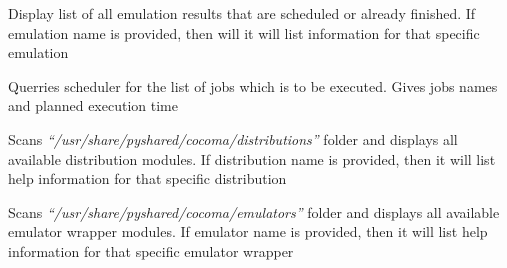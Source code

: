 \documentclass[letterpaper,10pt,english]{sphinxmanual}
\begin{document}

\begin{fulllineitems}
\label{01_how_to_use_it:cmdoption-ccmsh-r}
Display list of all emulation results that are scheduled or already finished. If emulation name is provided, then will it will list information for that specific emulation

\end{fulllineitems}


\begin{fulllineitems}
\label{01_how_to_use_it:cmdoption-ccmsh-j}
Querries scheduler for the list of jobs which is to be executed. Gives jobs names and planned execution time

\end{fulllineitems}


\begin{fulllineitems}
\label{01_how_to_use_it:cmdoption-ccmsh-i}
Scans \emph{``/usr/share/pyshared/cocoma/distributions''} folder and displays all available distribution modules.  If distribution name is provided, then it will list help information for that specific distribution

\end{fulllineitems}


\begin{fulllineitems}
\label{01_how_to_use_it:cmdoption-ccmsh-e}
Scans \emph{``/usr/share/pyshared/cocoma/emulators''} folder and displays all available emulator wrapper modules.  If emulator name is provided, then it will list help information for that specific emulator wrapper

\end{fulllineitems}
\end{document}
